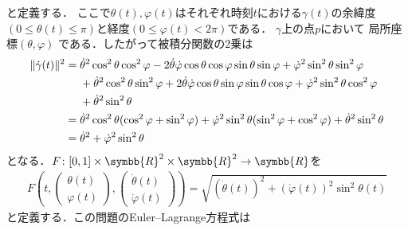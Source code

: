 \documentclass[../main.tex]{subfiles}
\begin{document}
と定義する．
ここで\(\theta(t), \varphi(t)\)はそれぞれ時刻\(t\)における\(\gamma(t)\)の余緯度\((0 \leq \theta(t) \leq \pi)\)と経度\((0 \leq \varphi(t) < 2\pi)\)である．
\(\gamma\)上の点\(p\)において
局所座標\((\theta, \varphi)\)
である．したがって被積分関数の\(2\)乗は
\begin{align*}
    \lVert \dot{\gamma}(t) \rVert^2
        &= \dot{\theta}^2 \cos^2 \theta \cos^2 \varphi
        - 2 \dot{\theta} \dot{\varphi} \cos \theta \cos \varphi \sin \theta  \sin \varphi
        + \dot{\varphi}^2 \sin^2 \theta \sin^2 \varphi \\
        &\mathrel{\hphantom{=}}{\relax} \mathbin{+} \dot{\theta}^2 \cos^2 \theta \sin^2 \varphi
             + 2 \dot{\theta} \dot{\varphi} \cos \theta \sin \varphi \sin \theta  \cos \varphi
            + \dot{\varphi}^2 \sin^2 \theta \cos^2 \varphi \\
        &\mathrel{\hphantom{=}}{\relax} \mathbin{+} \dot{\theta}^2 \sin^2 \theta \\
        &= \dot{\theta}^2 \cos^2 \theta (\cos^2\varphi + \sin^2 \varphi) + \dot{\varphi}^2 \sin^2 \theta (\sin^2 \varphi + \cos^2 \varphi) + \dot{\theta}^2 \sin^2 \theta \\
        &= \dot{\theta}^2  + \dot{\varphi}^2 \sin^2 \theta
\end{align*}
となる．\(F \colon [0, 1] \times \symbb{R}^2 \times \symbb{R}^2 \to \symbb{R}\)を
\begin{align*}
    F\left(t,
        \begin{pmatrix} \theta(t) \\ \varphi(t) \end{pmatrix},
        \begin{pmatrix} \dot{\theta}(t) \\ \dot{\varphi}(t) \end{pmatrix}\right) =
        \sqrt{(\dot{\theta}(t))^2 + (\dot{\varphi}(t))^2 \sin^2 \theta(t)}
\end{align*}
と定義する．この問題のEuler--Lagrange方程式は
\end{document}
